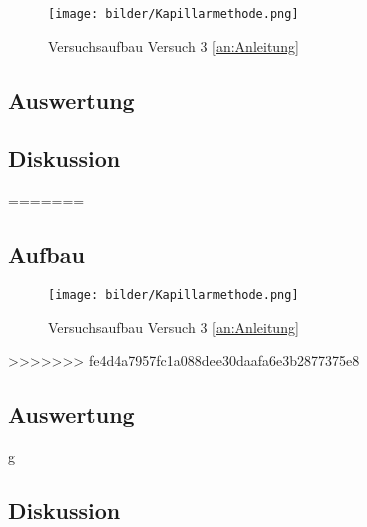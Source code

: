       \begin{figure}[H]
           \centering
           \texttt{[image: bilder/Kapillarmethode.png]}
           \caption{Versuchsaufbau Versuch 3 \ref{an:Anleitung}}
           \label{fig:Versuch3_Aufbau}
         \end{figure}
       \subsection{Auswertung}
         \subsection{Diskussion}
=======
        \subsection{Aufbau}

            \begin{figure}[H]
                \centering
                \texttt{[image: bilder/Kapillarmethode.png]}
                \caption{Versuchsaufbau Versuch 3 \ref{an:Anleitung}}
                \label{fig:Versuch3_Aufbau}
            \end{figure}
>>>>>>> fe4d4a7957fc1a088dee30daafa6e3b2877375e8

        \subsection{Auswertung}
        
        g\subsection{Diskussion}
